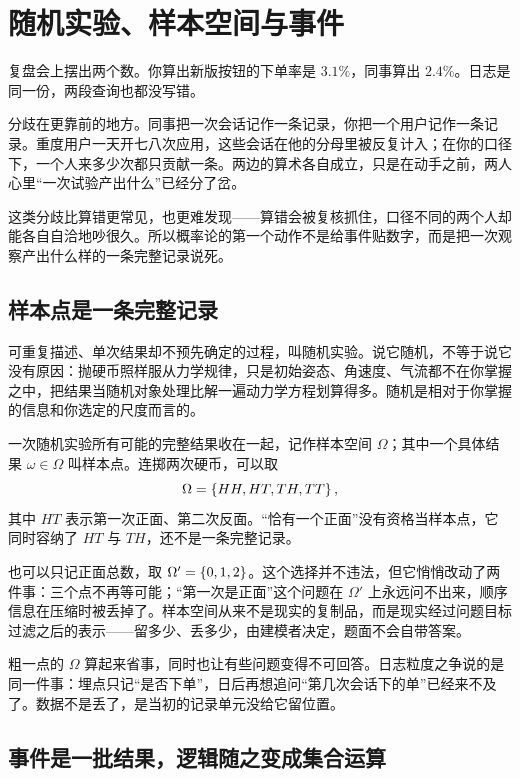 \section{随机实验、样本空间与事件}
\label{sec:05-Probability/01-Probability-Spaces/01}

复盘会上摆出两个数。你算出新版按钮的下单率是 \(3.1\%\)，同事算出 \(2.4\%\)。日志是同一份，两段查询也都没写错。

分歧在更靠前的地方。同事把一次会话记作一条记录，你把一个用户记作一条记录。重度用户一天开七八次应用，这些会话在他的分母里被反复计入；在你的口径下，一个人来多少次都只贡献一条。两边的算术各自成立，只是在动手之前，两人心里``一次试验产出什么''已经分了岔。

这类分歧比算错更常见，也更难发现——算错会被复核抓住，口径不同的两个人却能各自自洽地吵很久。所以概率论的第一个动作不是给事件贴数字，而是把一次观察产出什么样的一条完整记录说死。

\subsection{样本点是一条完整记录}

可重复描述、单次结果却不预先确定的过程，叫随机实验。说它随机，不等于说它没有原因：抛硬币照样服从力学规律，只是初始姿态、角速度、气流都不在你掌握之中，把结果当随机对象处理比解一遍动力学方程划算得多。随机是相对于你掌握的信息和你选定的尺度而言的。

一次随机实验所有可能的完整结果收在一起，记作样本空间 \(\Omega\)；其中一个具体结果 \(\omega\in\Omega\) 叫样本点。连掷两次硬币，可以取
\[
\Omega=\left\{HH,HT,TH,TT\right\},
\]
其中 \(HT\) 表示第一次正面、第二次反面。``恰有一个正面''没有资格当样本点，它同时容纳了 \(HT\) 与 \(TH\)，还不是一条完整记录。

也可以只记正面总数，取 \(\Omega'=\left\{0,1,2\right\}\)。这个选择并不违法，但它悄悄改动了两件事：三个点不再等可能；``第一次是正面''这个问题在 \(\Omega'\) 上永远问不出来，顺序信息在压缩时被丢掉了。样本空间从来不是现实的复制品，而是现实经过问题目标过滤之后的表示——留多少、丢多少，由建模者决定，题面不会自带答案。

粗一点的 \(\Omega\) 算起来省事，同时也让有些问题变得不可回答。日志粒度之争说的是同一件事：埋点只记``是否下单''，日后再想追问``第几次会话下的单''已经来不及了。数据不是丢了，是当初的记录单元没给它留位置。

\subsection{事件是一批结果，逻辑随之变成集合运算}

